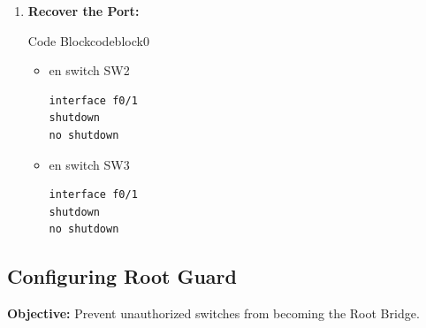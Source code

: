\documentclass[a4paper]{book}
\begin{document}
\begin{enumerate}
	\item \textbf{Recover the Port:}



	      \begin{ocg}{Code Block}{codeblock}{0}
		      \vspace{0.5cm}
		      \begin{itemize}
			      \item en switch SW2
			            \begin{lstlisting}
interface f0/1
shutdown
no shutdown
                \end{lstlisting}
			      \item en switch SW3
			            \begin{lstlisting}
interface f0/1
shutdown
no shutdown
                \end{lstlisting}
		      \end{itemize}
	      \end{ocg}
\end{enumerate}

\subsection*{Configuring Root Guard}

\textbf{Objective:} Prevent unauthorized switches from becoming the Root Bridge.
\end{document}
